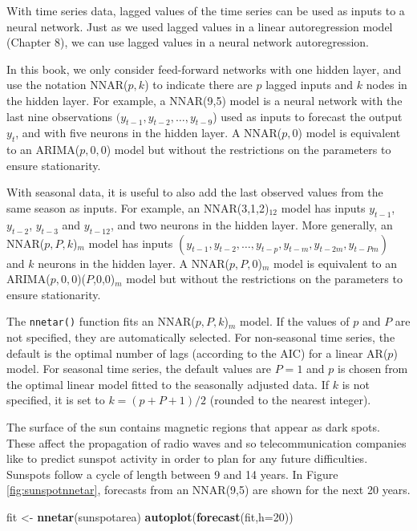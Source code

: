 \documentclass[]{book}
\newenvironment{Shaded}{\begin{snugshade}}{\end{snugshade}}
\newcommand{\DataTypeTok}[1]{\textcolor[rgb]{0.13,0.29,0.53}{#1}}
\newcommand{\DecValTok}[1]{\textcolor[rgb]{0.00,0.00,0.81}{#1}}
\newcommand{\KeywordTok}[1]{\textcolor[rgb]{0.13,0.29,0.53}{\textbf{#1}}}
\newcommand{\NormalTok}[1]{#1}
\newcommand{\StringTok}[1]{\textcolor[rgb]{0.31,0.60,0.02}{#1}}
\begin{document}
With time series data, lagged values of the time series can be used as inputs to a neural network. Just as we used lagged values in a linear autoregression model (Chapter 8), we can use lagged values in a neural network autoregression.

In this book, we only consider feed-forward networks with one hidden layer, and use the notation NNAR(\(p,k\)) to indicate there are \(p\) lagged inputs and \(k\) nodes in the hidden layer. For example, a NNAR(9,5) model is a neural network with the last nine observations \((y_{t-1},y_{t-2},\dots,y_{t-9}\)) used as inputs to forecast the output \(y_t\), and with five neurons in the hidden layer. A NNAR(\(p,0\)) model is equivalent to an ARIMA(\(p,0,0\)) model but without the restrictions on the parameters to ensure stationarity.

With seasonal data, it is useful to also add the last observed values from the same season as inputs. For example, an NNAR(3,1,2)\(_{12}\) model has inputs \(y_{t-1}\), \(y_{t-2}\), \(y_{t-3}\) and \(y_{t-12}\), and two neurons in the hidden layer. More generally, an NNAR(\(p,P,k\))\(_m\) model has inputs \((y_{t-1},y_{t-2},\dots,y_{t-p},y_{t-m},y_{t-2m},y_{t-Pm})\) and \(k\) neurons in the hidden layer. A NNAR(\(p,P,0\))\(_m\) model is equivalent to an ARIMA(\(p,0,0\))(\(P\),0,0)\(_m\) model but without the restrictions on the parameters to ensure stationarity.

The \texttt{nnetar()} function fits an NNAR(\(p,P,k\))\(_m\) model. If the values of \(p\) and \(P\) are not specified, they are automatically selected. For non-seasonal time series, the default is the optimal number of lags (according to the AIC) for a linear AR(\(p\)) model. For seasonal time series, the default values are \(P=1\) and \(p\) is chosen from the optimal linear model fitted to the seasonally adjusted data. If \(k\) is not specified, it is set to \(k=(p+P+1)/2\) (rounded to the nearest integer).

The surface of the sun contains magnetic regions that appear
as dark spots. These affect the propagation of radio waves and so
telecommunication companies like to predict sunspot activity in order to
plan for any future difficulties. Sunspots follow a cycle of length
between 9 and 14 years. In Figure \ref{fig:sunspotnnetar}, forecasts
from an NNAR(9,5) are shown for the next 20 years.

\begin{Shaded}
\begin{Highlighting}[]
\NormalTok{fit <-}\StringTok{ }\KeywordTok{nnetar}\NormalTok{(sunspotarea)}
\KeywordTok{autoplot}\NormalTok{(}\KeywordTok{forecast}\NormalTok{(fit,}\DataTypeTok{h=}\DecValTok{20}\NormalTok{))}
\end{Highlighting}
\end{Shaded}
\end{document}
